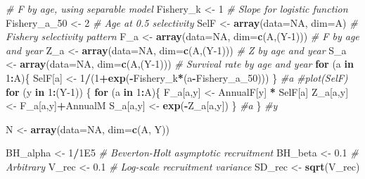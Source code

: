 \documentclass[
]{krantz}
\makeatletter
\newenvironment{Shaded}{\begin{snugshade}}{\end{snugshade}}
\newcommand{\AttributeTok}[1]{\textcolor[rgb]{0.27,0.27,0.27}{#1}}
\newcommand{\CommentTok}[1]{\textcolor[rgb]{0.37,0.37,0.37}{\textit{#1}}}
\newcommand{\ConstantTok}[1]{\textcolor[rgb]{0.37,0.37,0.37}{#1}}
\newcommand{\ControlFlowTok}[1]{\textcolor[rgb]{0.27,0.27,0.27}{\textbf{#1}}}
\newcommand{\DecValTok}[1]{\textcolor[rgb]{0.06,0.06,0.06}{#1}}
\newcommand{\FloatTok}[1]{\textcolor[rgb]{0.06,0.06,0.06}{#1}}
\newcommand{\FunctionTok}[1]{\textcolor[rgb]{0.27,0.27,0.27}{\textbf{#1}}}
\newcommand{\NormalTok}[1]{#1}
\newcommand{\OtherTok}[1]{\textcolor[rgb]{0.37,0.37,0.37}{#1}}
\newcommand{\SpecialCharTok}[1]{\textcolor[rgb]{0.43,0.43,0.43}{\textbf{#1}}}
\newenvironment{kframe}{%
\medskip{}
\setlength{\fboxsep}{.8em}
 \def\at@end@of@kframe{}%
 \ifinner\ifhmode%
  \def\at@end@of@kframe{\end{minipage}}%
  \begin{minipage}{\columnwidth}%
 \fi\fi%
 \def\FrameCommand##1{\hskip\@totalleftmargin \hskip-\fboxsep
 \colorbox{shadecolor}{##1}\hskip-\fboxsep
     \hskip-\linewidth \hskip-\@totalleftmargin \hskip\columnwidth}%
 \MakeFramed {\advance\hsize-\width
   \@totalleftmargin\z@ \linewidth\hsize
   \@setminipage}}%
 {\par\unskip\endMakeFramed%
 \at@end@of@kframe}
\renewenvironment{Shaded}{\begin{kframe}}{\end{kframe}}
\makeatother
\begin{document}
\begin{Shaded}
\begin{Highlighting}[]
\CommentTok{\# F by age, using separable model}
\NormalTok{Fishery\_k }\OtherTok{\textless{}{-}} \DecValTok{1} \CommentTok{\# Slope for logistic function}
\NormalTok{Fishery\_a\_50 }\OtherTok{\textless{}{-}} \DecValTok{2} \CommentTok{\# Age at 0.5 selectivity}
\NormalTok{SelF }\OtherTok{\textless{}{-}} \FunctionTok{array}\NormalTok{(}\AttributeTok{data=}\ConstantTok{NA}\NormalTok{, }\AttributeTok{dim=}\NormalTok{A) }\CommentTok{\# Fishery selectivity pattern}
\NormalTok{F\_a }\OtherTok{\textless{}{-}} \FunctionTok{array}\NormalTok{(}\AttributeTok{data=}\ConstantTok{NA}\NormalTok{, }\AttributeTok{dim=}\FunctionTok{c}\NormalTok{(A,(Y}\DecValTok{{-}1}\NormalTok{))) }\CommentTok{\# F by age and year}
\NormalTok{Z\_a }\OtherTok{\textless{}{-}} \FunctionTok{array}\NormalTok{(}\AttributeTok{data=}\ConstantTok{NA}\NormalTok{, }\AttributeTok{dim=}\FunctionTok{c}\NormalTok{(A,(Y}\DecValTok{{-}1}\NormalTok{))) }\CommentTok{\# Z by age and year}
\NormalTok{S\_a }\OtherTok{\textless{}{-}} \FunctionTok{array}\NormalTok{(}\AttributeTok{data=}\ConstantTok{NA}\NormalTok{, }\AttributeTok{dim=}\FunctionTok{c}\NormalTok{(A,(Y}\DecValTok{{-}1}\NormalTok{))) }\CommentTok{\# Survival rate by age and year}
\ControlFlowTok{for}\NormalTok{ (a }\ControlFlowTok{in} \DecValTok{1}\SpecialCharTok{:}\NormalTok{A)\{}
\NormalTok{  SelF[a] }\OtherTok{\textless{}{-}} \DecValTok{1}\SpecialCharTok{/}\NormalTok{(}\DecValTok{1}\SpecialCharTok{+}\FunctionTok{exp}\NormalTok{(}\SpecialCharTok{{-}}\NormalTok{Fishery\_k}\SpecialCharTok{*}\NormalTok{(a}\SpecialCharTok{{-}}\NormalTok{Fishery\_a\_50)))}
\NormalTok{  \} }\CommentTok{\#a}
\CommentTok{\#plot(SelF)}
\ControlFlowTok{for}\NormalTok{ (y }\ControlFlowTok{in} \DecValTok{1}\SpecialCharTok{:}\NormalTok{(Y}\DecValTok{{-}1}\NormalTok{)) \{}
  \ControlFlowTok{for}\NormalTok{ (a }\ControlFlowTok{in} \DecValTok{1}\SpecialCharTok{:}\NormalTok{A)\{}
\NormalTok{    F\_a[a,y] }\OtherTok{\textless{}{-}}\NormalTok{ AnnualF[y] }\SpecialCharTok{*}\NormalTok{ SelF[a]}
\NormalTok{    Z\_a[a,y] }\OtherTok{\textless{}{-}}\NormalTok{ F\_a[a,y]}\SpecialCharTok{+}\NormalTok{AnnualM}
\NormalTok{    S\_a[a,y] }\OtherTok{\textless{}{-}} \FunctionTok{exp}\NormalTok{(}\SpecialCharTok{{-}}\NormalTok{Z\_a[a,y])}
\NormalTok{  \} }\CommentTok{\#a}
\NormalTok{\} }\CommentTok{\#y}

\NormalTok{N }\OtherTok{\textless{}{-}} \FunctionTok{array}\NormalTok{(}\AttributeTok{data=}\ConstantTok{NA}\NormalTok{, }\AttributeTok{dim=}\FunctionTok{c}\NormalTok{(A, Y))}

\NormalTok{BH\_alpha }\OtherTok{\textless{}{-}} \DecValTok{1}\SpecialCharTok{/}\FloatTok{1E5} \CommentTok{\# Beverton{-}Holt asymptotic recruitment}
\NormalTok{BH\_beta }\OtherTok{\textless{}{-}} \FloatTok{0.1} \CommentTok{\# Arbitrary}
\NormalTok{V\_rec }\OtherTok{\textless{}{-}} \FloatTok{0.1} \CommentTok{\# Log{-}scale recruitment variance}
\NormalTok{SD\_rec }\OtherTok{\textless{}{-}} \FunctionTok{sqrt}\NormalTok{(V\_rec)}


\end{Highlighting}
\end{Shaded}
\end{document}
